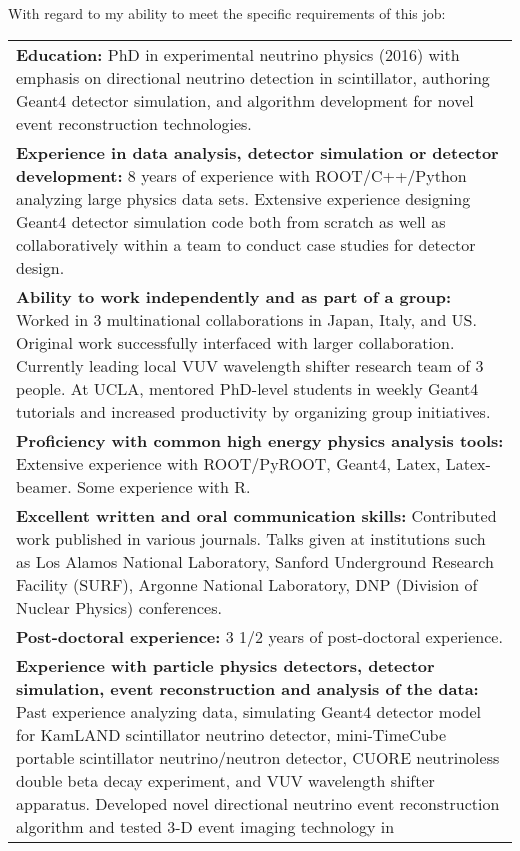 \documentclass[11pt]{moderncv}        %
\begin{document}
With regard to my ability to meet the specific requirements of this job:\\
\noindent\begin{tabularx}{\linewidth}{@{{}\textbullet\enskip}X@{\quad}@{}}
	\textbf{Education:} PhD in experimental neutrino physics (2016) with
	emphasis on directional neutrino detection in scintillator, authoring
	Geant4 detector simulation, and algorithm development for novel event
	reconstruction technologies.\\
	\textbf{Experience in data analysis, detector simulation or detector
	development:}
	8 years of experience with ROOT/C++/Python analyzing large physics data
	sets. Extensive experience designing Geant4 detector simulation code both
	from scratch as well as collaboratively within a team to conduct case
	studies for detector design.\\
	\textbf{Ability to work independently and as part of a group:}
	Worked in 3 multinational collaborations in Japan, Italy, and US. Original
	work successfully interfaced with larger collaboration. Currently leading
	local VUV wavelength shifter research team of 3 people. At UCLA, mentored
	PhD-level students in weekly Geant4 tutorials and increased productivity by
	organizing group initiatives.\\
	\textbf{Proficiency with common high energy physics analysis tools:}
	Extensive experience with ROOT/PyROOT, Geant4, Latex, Latex-beamer. Some
	experience with R.\\
	\textbf{Excellent written and oral communication skills:}
	Contributed work published in various journals. Talks given at institutions
	such as Los Alamos National Laboratory, Sanford Underground Research
	Facility (SURF), Argonne National Laboratory, DNP (Division of Nuclear
	Physics) conferences.\\
	\textbf{Post-doctoral experience:}
	3 1/2 years of post-doctoral experience.\\
	\textbf{Experience with particle physics detectors, detector simulation,
	event reconstruction and analysis of the data:}
	Past experience analyzing data, simulating Geant4 detector model for KamLAND
	scintillator neutrino detector, mini-TimeCube portable scintillator
	neutrino/neutron detector, CUORE neutrinoless double beta decay experiment,
	and VUV wavelength shifter apparatus. Developed novel directional neutrino
	event reconstruction algorithm and tested 3-D event imaging technology in

\end{tabularx}
\end{document}
